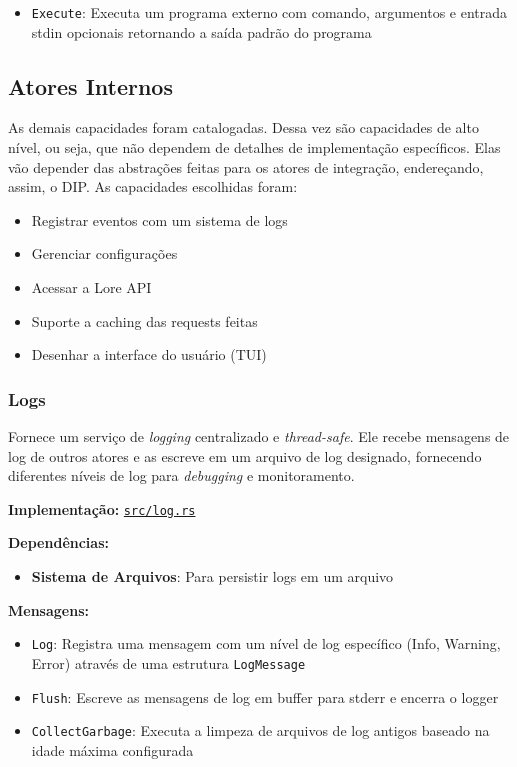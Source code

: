 \begin{itemize}
    \item \texttt{Execute}: Executa um programa externo com comando, argumentos e entrada stdin opcionais retornando a saída padrão do programa 
\end{itemize}

\subsection{Atores Internos}

As demais capacidades foram catalogadas. Dessa vez são capacidades de alto nível, ou seja, que não dependem de detalhes de implementação específicos. Elas vão depender das abstrações feitas para os atores de integração, endereçando, assim, o DIP. As capacidades escolhidas foram:

\begin{itemize}
	\item Registrar eventos com um sistema de logs
	\item Gerenciar configurações
	\item Acessar a Lore API
	\item Suporte a caching das requests feitas
	\item Desenhar a interface do usuário (TUI)
\end{itemize}

\subsubsection{Logs}

Fornece um serviço de \emph{logging} centralizado e \emph{thread-safe}. Ele recebe mensagens de log de outros atores e as escreve em um arquivo de log designado, fornecendo diferentes níveis de log para \emph{debugging} e monitoramento.

\textbf{Implementação:} \href{https://github.com/nahharris/ph-actors-tcc/blob/master/src/log.rs}{\texttt{src/log.rs}}

\textbf{Dependências:}

\begin{itemize}
    \item \textbf{Sistema de Arquivos}: Para persistir logs em um arquivo
\end{itemize}

\textbf{Mensagens:}

\begin{itemize}
    \item \texttt{Log}: Registra uma mensagem com um nível de log específico (Info, Warning, Error) através de uma estrutura \texttt{LogMessage}
    \item \texttt{Flush}: Escreve as mensagens de log em buffer para stderr e encerra o logger
    \item \texttt{CollectGarbage}: Executa a limpeza de arquivos de log antigos baseado na idade máxima configurada
\end{itemize}

